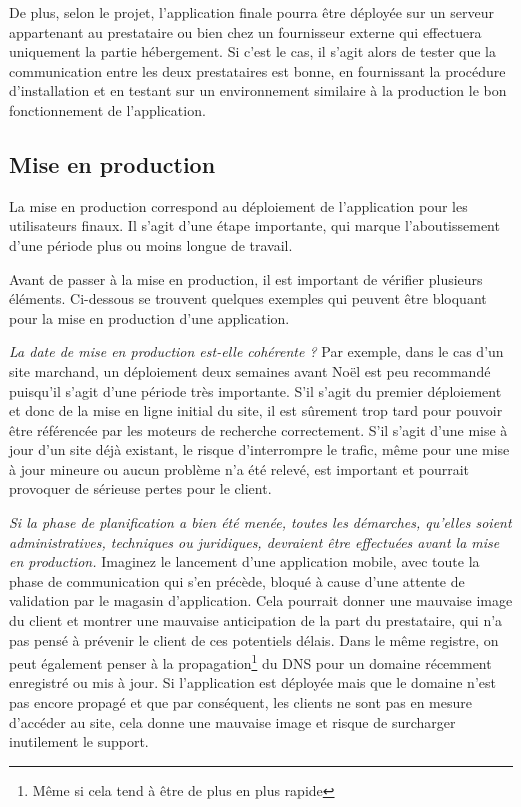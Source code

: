 De plus, selon le projet, l'application finale pourra être déployée sur un serveur appartenant au prestataire ou bien chez un fournisseur externe qui effectuera uniquement la partie hébergement. Si c'est le cas, il s'agit alors de tester que la communication entre les deux prestataires est bonne, en fournissant la procédure d'installation et en testant sur un environnement similaire à la production le bon fonctionnement de l'application.

\subsection{Mise en production}


La mise en production correspond au déploiement de l'application pour les utilisateurs finaux. Il s'agit d'une étape importante, qui marque l'aboutissement d'une période plus ou moins longue de travail.

Avant de passer à la mise en production, il est important de vérifier plusieurs éléments. Ci-dessous se trouvent quelques exemples qui peuvent être bloquant pour la mise en production d'une application.

\textit{La date de mise en production est-elle cohérente ?} Par exemple, dans le cas d'un site marchand, un déploiement deux semaines avant Noël est peu recommandé puisqu'il s'agit d'une période très importante. S'il s'agit du premier déploiement et donc de la mise en ligne initial du site, il est sûrement trop tard pour pouvoir être référencée par les moteurs de recherche correctement. S'il s'agit d'une mise à jour d'un site déjà existant, le risque d'interrompre le trafic, même pour une mise à jour mineure ou aucun problème n'a été relevé, est important et pourrait provoquer de sérieuse pertes pour le client.

\textit{Si la phase de planification a bien été menée, toutes les démarches, qu'elles soient administratives, techniques ou juridiques, devraient être effectuées avant la mise en production.} Imaginez le lancement d'une application mobile, avec toute la phase de communication qui s'en précède, bloqué à cause d'une attente de validation par le magasin d'application. Cela pourrait donner une mauvaise image du client et montrer une mauvaise anticipation de la part du prestataire, qui n'a pas pensé à prévenir le client de ces potentiels délais. Dans le même registre, on peut également penser à la propagation\footnote{Même si cela tend à être de plus en plus rapide} du \gls{DNS} pour un domaine récemment enregistré ou mis à jour. Si l'application est déployée mais que le domaine n'est pas encore propagé et que par conséquent, les clients ne sont pas en mesure d'accéder au site, cela donne une mauvaise image et risque de surcharger inutilement le support.

